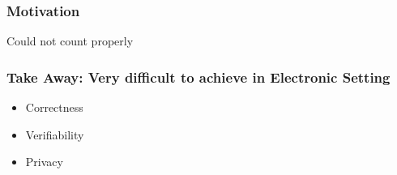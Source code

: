 \documentclass{beamer}
\begin{document}
\begin{frame}
\frametitle{Motivation}
{Could not count properly}
\begin{center}
\end{center}
\end{frame}



%
%


\begin{frame}
\frametitle{Take Away: Very difficult to achieve in Electronic Setting}
\begin{itemize}
\item Correctness
\item Verifiability
\item Privacy
\end{itemize}
\end{frame}
\end{document}
